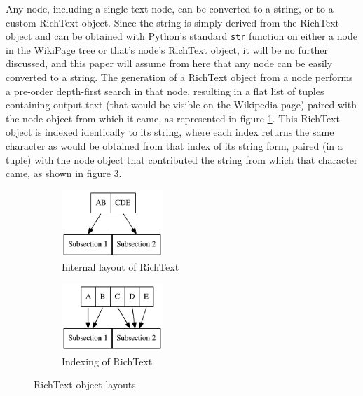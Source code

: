 Any node, including a single text node, can be converted to a string, or to a custom RichText object. Since the string is simply derived from the RichText object and can be obtained with Python's standard \verb|str| function on either a node in the WikiPage tree or that's node's RichText object, it will be no further discussed, and this paper will assume from here that any node can be easily converted to a string. The generation of a RichText object from a node performs a pre-order depth-first search in that node, resulting in a flat list of tuples containing output text (that would be visible on the Wikipedia page) paired with the node object from which it came, as represented in figure \ref{strblock}. This RichText object is indexed identically to its string, where each index returns the same character as would be obtained from that index of its string form, paired (in a tuple) with the node object that contributed the string from which that character came, as shown in figure \ref{strindiv}.

\begin{figure}[!t]
\centering
\begin{subfigure}{.225\textwidth}
  \centering
  \includegraphics[width=1.5in]{string_graph2}
  \caption{Internal layout of RichText}
  \label{strblock}
\end{subfigure}%
\begin{subfigure}{.225\textwidth}
  \centering
  \includegraphics[width=1.5in]{string_graph}
  \caption{Indexing of RichText}
  \label{strindiv}
\end{subfigure}
\caption{RichText object layouts}
\end{figure}


